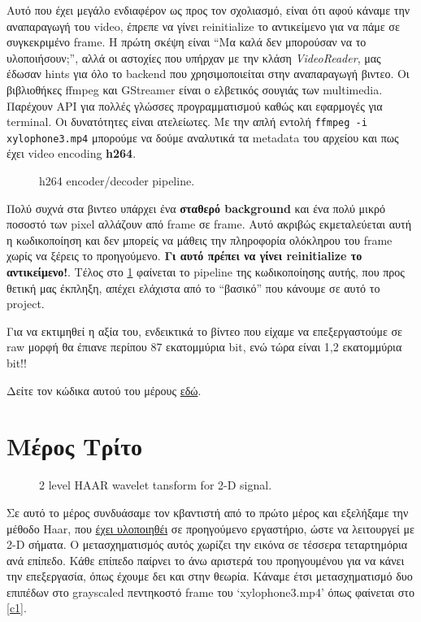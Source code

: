\documentclass[11pt]{scrartcl} %
\begin{document}
 Αυτό που έχει μεγάλο ενδιαφέρον ως προς τον σχολιασμό, είναι ότι αφού κάναμε την αναπαραγωγή του video, έπρεπε να γίνει reinitialize
το αντικείμενο για να πάμε σε συγκεκριμένο frame. Η πρώτη σκέψη είναι ``Μα καλά δεν μπορούσαν να το υλοποιήσουν;'', αλλά οι αστοχίες που υπήρχαν με την κλάση \textit{VideoReader},
μας έδωσαν hints για όλο το backend που χρησιμοποιείται στην αναπαραγωγή βιντεο. Οι βιβλιοθήκες ffmpeg και GStreamer είναι ο ελβετικός σουγιάς των multimedia. Παρέχουν API για πολλές
γλώσσες προγραμματισμού καθώς και εφαρμογές για terminal. Οι δυνατότητες είναι ατελείωτες. Με την απλή εντολή \lstinline{ffmpeg -i xylophone3.mp4} μπορούμε να δούμε αναλυτικά τα metadata
του αρχείου και πως έχει video encoding \textbf{h264}.


\begin{figure}[h]
    \centering
    \caption{h264 encoder/decoder pipeline.}
    \label{h264}
\end{figure}


Πολύ συχνά στα βιντεο υπάρχει ένα \textbf{σταθερό background} και ένα πολύ
μικρό ποσοστό των pixel αλλάζουν από frame σε frame. Αυτό ακριβώς εκμεταλεύεται αυτή η κωδικοποίηση και δεν μπορείς να μάθεις την πληροφορία ολόκληρου του frame χωρίς να ξέρεις το προηγούμενο.
\textbf{Γι αυτό πρέπει να γίνει reinitialize το αντικείμενο!}. Τέλος στο \ref{h264} φαίνεται το pipeline της κωδικοποίησης αυτής, που προς θετική μας έκπληξη, απέχει ελάχιστα από το ``βασικό''
που κάνουμε σε αυτό το project.

Για να εκτιμηθεί η αξία του, ενδεικτικά το βίντεο που είχαμε να επεξεργαστούμε σε raw μορφή θα έπιανε περίπου 87 εκατομμύρια bit, ενώ τώρα είναι 1,2 εκατομμύρια bit!!

Δείτε τον κώδικα αυτού του μέρους \hyperlink{partB}{εδώ}.

\clearpage
\section{Μέρος Τρίτο}

\begin{figure}[h]
    \centering
    \caption{2 level HAAR wavelet tansform for 2-D signal.}
    \label{haar}
\end{figure}


Σε αυτό το μέρος συνδυάσαμε τον κβαντιστή από το πρώτο μέρος και εξελήξαμε την μέθοδο Haar, που \hyperlink{haar1}{έχει υλοποιηθέι} σε προηγούμενο εργαστήριο, ώστε να λειτουργεί με 2-D σήματα.
Ο μετασχηματισμός αυτός χωρίζει την εικόνα
σε τέσσερα τεταρτημόρια ανά επίπεδο. Κάθε επίπεδο παίρνει το άνω αριστερά του προηγουμένου για να κάνει την επεξεργασία, όπως έχουμε δει και στην θεωρία.
Κάναμε έτσι μετασχηματισμό δυο επιπέδων στο grayscaled πεντηκοστό frame του `xylophone3.mp4' όπως φαίνεται στο \ref{c1}.
\end{document}
